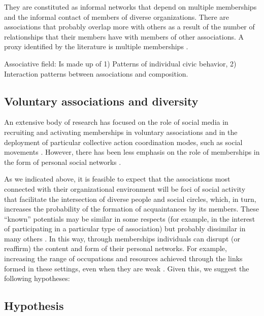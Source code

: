 They are constituted as informal networks that depend on multiple memberships and the informal contact of members of diverse organizations. There are associations that probably overlap more with others as a result of the number of relationships that their members have with members of other associations. A proxy identified by the literature is multiple memberships \parencite{moody_structural_2003, paxton_association_2007,pena_lopez_capital_2018}. 
\bigskip

Associative field: Is made up of 1) Patterns of individual civic behavior, 2) Interaction patterns between associations and composition. 

\subsection{Voluntary associations and diversity}

An extensive body of research has focused on the role of social media in recruiting and activating memberships in voluntary associations and in the deployment of particular collective action coordination modes, such as social movements \parencite{gould_collective_1993,mcpherson_social_1992,tilly_mobilization_1978}. However, there has been less emphasis on the role of memberships in the form of personal social networks \parencite{benton_uniters_2016,tindall_network_2012}.
\bigskip

As we indicated above, it is feasible to expect that the associations most connected with their organizational environment will be foci of social activity that facilitate the intersection of diverse people and social circles, which, in turn, increases the probability of the formation of acquaintances by its members. These “known” potentials may be similar in some respects (for example, in the interest of participating in a particular type of association) but probably dissimilar in many others \parencite{erickson_social_2003}. In this way, through memberships individuals can disrupt (or reaffirm) the content and form of their personal networks. For example, increasing the range of occupations and resources achieved through the links formed in these settings, even when they are weak \parencite{benton_uniters_2016,magee_civic_2008,son_social_2008}. Given this, we suggest the following hypotheses:

\subsection{Hypothesis} 

